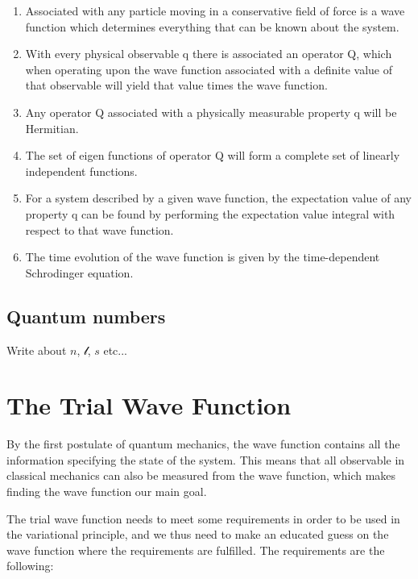 \begin{enumerate}
\item Associated with any particle moving in a conservative field of force is a wave function which determines everything that can be known about the system.

\item With every physical observable q there is associated an operator Q, which when operating upon the wave function associated with a definite value of that observable will yield that value times the wave function.

\item Any operator Q associated with a physically measurable property q will be Hermitian.

\item The set of eigen functions of operator Q will form a complete set of linearly independent functions.

\item For a system described by a given wave function, the expectation value of any property q can be found by performing the expectation value integral with respect to that wave function.

\item The time evolution of the wave function is given by the time-dependent Schrodinger equation. 
\end{enumerate}

\subsection{Quantum numbers}
Write about $n$, $\mathcal{l}$, $s$ etc...

\section{The Trial Wave Function} \label{subsec:wavefunction}
By the first postulate of quantum mechanics, the wave function contains all the information specifying the state of the system. This means that all observable in classical mechanics can also be measured from the wave function, which makes finding the wave function our main goal.

The trial wave function needs to meet some requirements in order to be used in the variational principle, and we thus need to make an educated guess on the wave function where the requirements are fulfilled. The requirements are the following:

